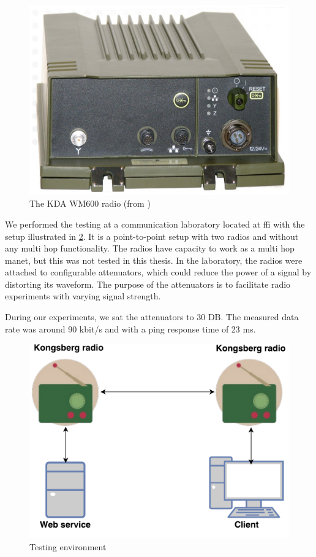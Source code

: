 \begin{figure}[h]
\centering
\includegraphics[scale=0.2]{images/kda_wm600.jpg}
\caption{The KDA WM600 radio (from \cite{kongsberg-wm600})}
\label{figure-kdawm600}
\end{figure}

We performed the testing at a communication laboratory located at \gls{ffi} with
the setup illustrated in \cref{figure-radio-testing-environment}. It is a
point-to-point setup with two radios and without any multi hop functionality.
The radios have capacity to work as a multi hop \gls{manet}, but this was not
tested in this thesis. In the laboratory, the radios were attached to
configurable attenuators, which could reduce the power of a signal by distorting
its waveform. The purpose of the attenuators is to facilitate radio experiments
with varying signal strength.

During our experiments, we sat the attenuators to 30 DB. The measured data rate
was around 90 kbit/s and with a ping response time of 23 ms.

\begin{figure}[h]
\centering
\includegraphics[scale=0.6]{images/radio_testing_environment.pdf}
\caption{Testing environment}
\label{figure-radio-testing-environment}
\end{figure}


